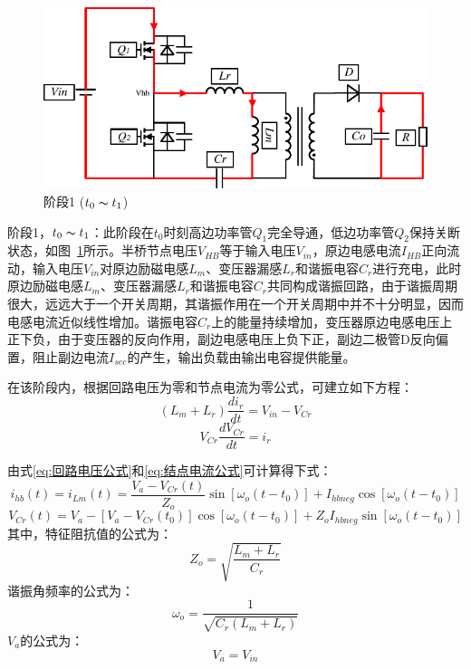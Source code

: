 \begin{figure}[htbp] 
    \centering
    \includegraphics[width=0.6\linewidth]{figures/工作原理1.pdf}
    \caption{阶段1 ($t_0 \thicksim t_1$)}
    \label{fig:工作原理1}
\end{figure}
                
阶段1，$t_0 \thicksim t_1$：此阶段在$t_0$时刻高边功率管$Q_1$完全导通，低边功率管$Q_2$保持关断状态，如图~\ref{fig:工作原理1}所示。半桥节点电压$V_{HB}$等于输入电压$V_{in}$，原边电感电流$I_{HB}$正向流动，输入电压$V_{in}$对原边励磁电感$L_m$、变压器漏感$L_r$和谐振电容$C_r$进行充电，此时原边励磁电感$L_m$、变压器漏感$L_r$和谐振电容$C_r$共同构成谐振回路，由于谐振周期很大，远远大于一个开关周期，其谐振作用在一个开关周期中并不十分明显，因而电感电流近似线性增加。谐振电容$C_r$上的能量持续增加，变压器原边电感电压上正下负，由于变压器的反向作用，副边电感电压上负下正，副边二极管D反向偏置，阻止副边电流$I_{sec}$的产生，输出负载由输出电容提供能量。

在该阶段内，根据回路电压为零和节点电流为零公式，可建立如下方程：
\begin{equation}
    \label{eq:回路电压公式}
    (L_m + L_r)\frac{di_r}{dt} = V_{in} - V_{Cr}  
\end{equation}
\begin{equation}
    \label{eq:结点电流公式}
    V_{Cr}\frac{dV_{Cr}}{dt} = i_r 
\end{equation}

由式\eqref{eq:回路电压公式}和\eqref{eq:结点电流公式}可计算得下式：
\begin{equation}
    \label{eq:Ihb公式1}
    i_{hb}(t) = i_{Lm}(t) = \frac{V_{a}-V_{Cr}(t)}{Z_o}\sin[\omega_o(t-t_0)] + I_{hbneg}\cos[\omega_o(t-t_0)]  
\end{equation}
\begin{equation}
    \label{eq:Vcr_2}
    V_{Cr}(t) =V_{a}-[V_{a}-V_{Cr}(t_0)]\cos[\omega_o(t-t_0)] + {Z_o} I_{hbneg} \sin[\omega_o(t-t_0)]
\end{equation}
其中，特征阻抗值的公式为：
\begin{equation}
    \label{eq:Zo公式}
    Z_o=\sqrt{\frac{L_m+L_r}{C_r}}  
\end{equation}
谐振角频率的公式为：
\begin{equation}
    \label{eq:omega_o公式}
    \omega_o=\frac{1}{\sqrt{C_r(L_m+L_r)}}
\end{equation}
$V_{a}$的公式为：
\begin{equation}
    \label{eq:Vhb公式1}
    V_{a}=V_{in}
\end{equation}

